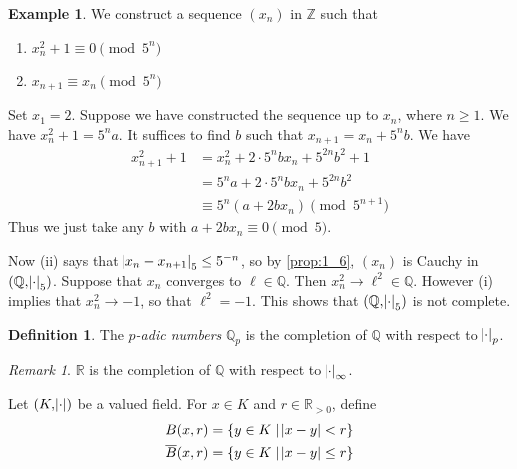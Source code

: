 \documentclass[11pt]{article}
\theoremstyle{definition}
\newtheorem{definition}{Definition}[subsection]
\newtheorem*{example}{Example}
\theoremstyle{plain}
\theoremstyle{remark}
\newtheorem*{remark}{Remark}
\newcommand{\bZ}{\mathbb{Z}}
\newcommand{\bQ}{\mathbb{Q}}
\newcommand{\bR}{\mathbb{R}}
\begin{document}
\begin{example}
    We construct a sequence $(x_n)$ in $\bZ$ such that
    \begin{enumerate}
        \item $x_n^2 + 1 \equiv 0 \pmod{5^n}$
        \item $x_{n + 1} \equiv x_n \pmod{5^n}$
    \end{enumerate}

    Set $x_1 = 2$. Suppose we have constructed the sequence up to $x_n$, where $n \ge 1$. We have $x_n^2 + 1 = 5^n a$. It suffices to find $b$ such that $x_{n+1} = x_n + 5^n b$. We have
    \begin{align*}
        x_{n+1}^2 + 1
        &= x_n^2 + 2 \cdot 5^n b x_n + 5^{2n} b^2 + 1\\
        &= 5^n a + 2 \cdot 5^n b x_n + 5^{2n} b^2\\
        &\equiv 5^n (a + 2 b x_n) \pmod{5^{n+1}}
    \end{align*}
    Thus we just take any $b$ with $a + 2b x_n \equiv 0 \pmod{5}$.

    Now (ii) says that $\abs{x_n - x_{n+1}}_5 \le 5^{-n}$, so by \autoref{prop:1_6}, $(x_n)$ is Cauchy in $(\bQ, \abs{\cdot}_5)$. Suppose that $x_n$ converges to $\ell \in \bQ$. Then $x_n^2 \rightarrow \ell^2 \in \bQ$. However (i) implies that $x_n^2 \rightarrow -1$, so that $\ell^2 = -1$. This shows that $(\bQ, \abs{\cdot}_5)$ is not complete.
\end{example}

\begin{definition}
    The \emph{$p$-adic numbers} $\bQ_p$ is the completion of $\bQ$ with respect to $\abs{\cdot}_p$.
\end{definition}

\begin{remark}
    $\bR$ is the completion of $\bQ$ with respect to $\abs{\cdot}_\infty$.
\end{remark}

\noindent Let $(K, \abs{\cdot})$ be a valued field. For $x \in K$ and $r \in \bR_{> 0}$, define
\begin{align*}
    B(x, r) &= \{y \in K \mid \abs{x - y} < r\}\\
    \overline{B}(x, r) &= \{y \in K \mid \abs{x - y} \le r\}
\end{align*}
\end{document}
